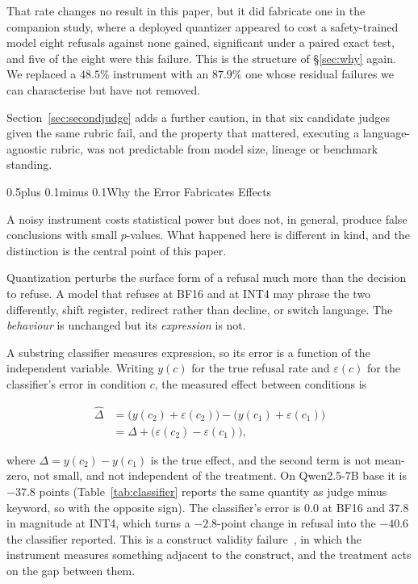 \documentclass[conference,compsoc,letterpaper]{IEEEtran}
\makeatletter
\def\section{\@startsection{section}{1}{\z@}{1\baselineskip plus 0.25\baselineskip minus 0.25\baselineskip}%
{0.5\baselineskip plus 0.1\baselineskip minus 0.1\baselineskip}{\normalfont\large\bfseries}}%
\makeatother
\begin{document}
That rate changes no result in this paper, but it did fabricate one in the companion study, where a deployed quantizer appeared to cost a safety-trained model eight refusals against none gained, significant under a paired exact test, and five of the eight were this failure. This is the structure of \S\ref{sec:why} again. We replaced a $48.5\%$ instrument with an $87.9\%$ one whose residual failures we can characterise but have not removed.

Section~\ref{sec:secondjudge} adds a further caution, in that six candidate judges given the same rubric fail, and the property that mattered, executing a language-agnostic rubric, was not predictable from model size, lineage or benchmark standing.

\section{Why the Error Fabricates Effects} \label{sec:why}

A noisy instrument costs statistical power but does not, in general, produce false conclusions with small $p$-values. What happened here is different in kind, and the distinction is the central point of this paper.

Quantization perturbs the surface form of a refusal much more than the decision to refuse. A model that refuses at BF16 and at INT4 may phrase the two differently, shift register, redirect rather than decline, or switch language. The \emph{behaviour} is unchanged but its \emph{expression} is not.

A substring classifier measures expression, so its error is a function of the independent variable. Writing $y(c)$ for the true refusal rate and $\varepsilon(c)$ for the classifier's error in condition $c$, the measured effect between conditions is

\begin{align*} \widehat{\Delta} &= \bigl(y(c_2) + \varepsilon(c_2)\bigr) - \bigl(y(c_1) + \varepsilon(c_1)\bigr) \\ &= \Delta + \bigl(\varepsilon(c_2) - \varepsilon(c_1)\bigr), \end{align*}

where $\Delta = y(c_2)-y(c_1)$ is the true effect, and the second term is not mean-zero, not small, and not independent of the treatment. On Qwen2.5-7B base it is $-37.8$ points (Table~\ref{tab:classifier} reports the same quantity as judge minus keyword, so with the opposite sign). The classifier's error is $0.0$ at BF16 and $37.8$ in magnitude at INT4, which turns a $-2.8$-point change in refusal into the $-40.6$ the classifier reported. This is a construct validity failure~\cite{cronbach1955}, in which the instrument measures something adjacent to the construct, and the treatment acts on the gap between them.
\end{document}
